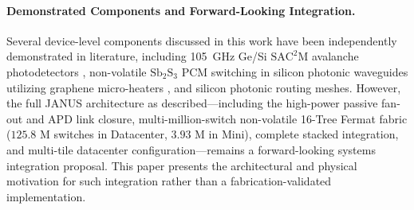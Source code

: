 \documentclass[journal]{IEEEtran}
\begin{document}
\paragraph{\textbf{Demonstrated Components and Forward-Looking Integration.}}

Several device-level components discussed in this work have been independently demonstrated in literature, including 105~GHz Ge/Si $\mathrm{SAC^2M}$ avalanche photodetectors \cite{Chen2025}, non-volatile $\mathrm{Sb_2S_3}$ PCM switching in silicon photonic waveguides utilizing graphene micro-heaters \cite{Delaney2020,Rios2021}, and silicon photonic routing meshes. However, the full JANUS architecture as described---including the high-power passive fan-out and APD link closure, multi-million-switch non-volatile 16-Tree Fermat fabric ($125.8\text{ M}$ switches in Datacenter, $3.93\text{ M}$ in Mini), complete stacked integration, and multi-tile datacenter configuration---remains a forward-looking systems integration proposal. This paper presents the architectural and physical motivation for such integration rather than a fabrication-validated implementation.
\end{document}
